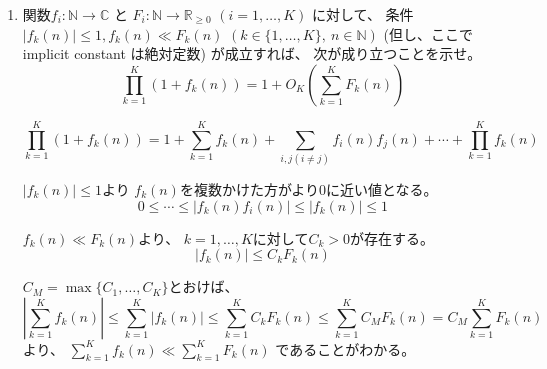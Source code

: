 \documentclass[12pt,b5paper]{ltjsarticle}
\begin{document}
\begin{enumerate}
\begin{enumerate}
            \hrulefill

       \item
            関数$f_{i}:\mathbb{N}\to\mathbb{C}$
            と
            $F_{i}:\mathbb{N}\to\mathbb{R}_{\geq 0}$
            $(i=1,\dots,K)$
            に対して、
            条件
            $\lvert f_{k}(n) \rvert \leq 1, f_{k}(n) \ll F_{k}(n)$
            $(k\in\{1,\dots,K\}, \ n\in\mathbb{N})$
            (但し、ここで implicit constant は絶対定数)
            が成立すれば、
            次が成り立つことを示せ。
            \begin{equation}
             \prod_{k=1}^{K} (1 + f_{k}(n))
              = 1 + O_{K}\left( \sum_{k=1}^{K}F_{k}(n) \right)
            \end{equation}

            \dotfill

            \begin{equation}
             \prod_{k=1}^{K} (1 + f_{k}(n))
              = 1 + \sum_{k=1}^{K} f_{k}(n)
              + \sum_{i,j(i\ne j)} f_{i}(n) f_{j}(n) + \cdots
              + \prod_{k=1}^{K} f_{k}(n)
            \end{equation}



            $\lvert f_{k}(n) \rvert \leq 1$より
            $f_{k}(n)$を複数かけた方がより$0$に近い値となる。
            \begin{equation}
             0\leq \cdots \leq
             \lvert f_{k}(n)f_{i}(n) \rvert
              \leq
             \lvert f_{k}(n) \rvert
              \leq 1
            \end{equation}


            $f_{k}(n) \ll F_{k}(n)$より、
            $k=1,\dots,K$に対して$C_{k}>0$が存在する。
            \begin{equation}
             \lvert f_{k}(n) \rvert \leq C_{k} F_k(n)
            \end{equation}

            $C_{M} = \max\{C_{1},\dots,C_{K}\}$とおけば、
            \begin{equation}
             \left\lvert \sum_{k=1}^{K}f_{k}(n) \right\rvert
              \leq
              \sum_{k=1}^{K} \lvert f_{k}(n) \rvert
              \leq \sum_{k=1}^{K}C_{k} F_k(n)
              \leq \sum_{k=1}^{K}C_{M} F_k(n)
              = C_{M} \sum_{k=1}^{K} F_k(n)
            \end{equation}
            より、
            $\sum_{k=1}^{K}f_{k}(n) \ll \sum_{k=1}^{K} F_k(n)$
            であることがわかる。


\end{enumerate}
\end{enumerate}
\end{document}
